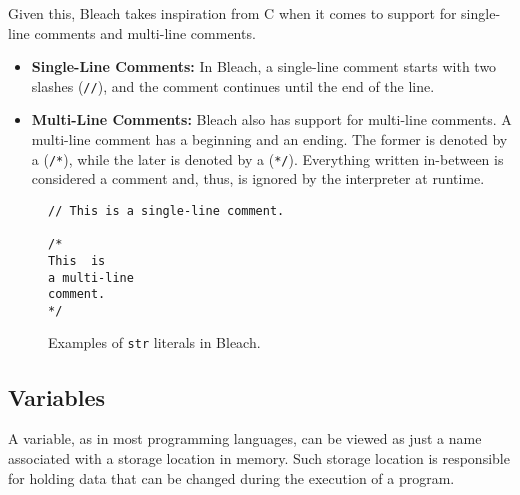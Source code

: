 Given this, Bleach takes inspiration from C \cite{kernighan1988c} when it comes to support for single-line comments and multi-line comments.

\begin{itemize}
    \item \textbf{Single-Line Comments:} In Bleach, a single-line comment starts with two slashes (\texttt{//}), and the comment continues until the end of the line.
    \item \textbf{Multi-Line Comments:} Bleach also has support for multi-line comments. A multi-line comment has a beginning and an ending. The former is denoted by a (\texttt{/*}), while the later is denoted by a (\texttt{*/}). Everything written in-between is considered a comment and, thus, is ignored by the interpreter at runtime.
\end{itemize}

    \begin{figure}[H]
        \centering
        \begin{lstlisting}
// This is a single-line comment.

/*
This  is
a multi-line
comment.
*/
        \end{lstlisting}
        \caption{Examples of \texttt{str} literals in Bleach.}
    \end{figure}

\subsection{Variables}
A variable, as in most programming languages, can be viewed as just a name associated with a storage location in memory. Such storage location is responsible for holding data that can be changed during the execution of a program.

